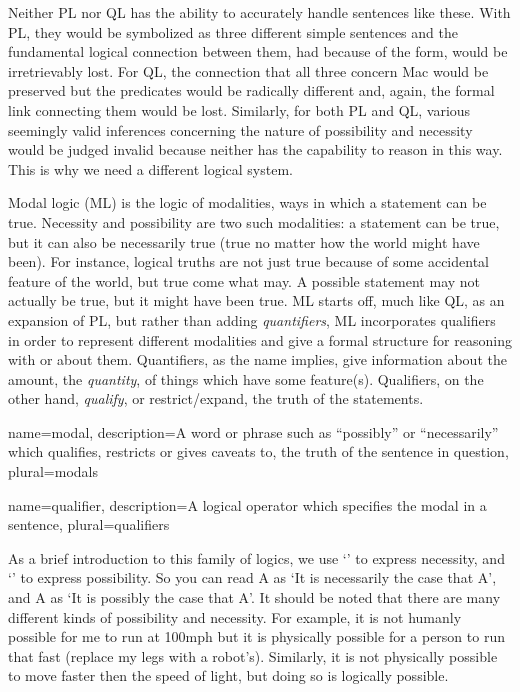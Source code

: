 Neither PL nor QL has the ability to accurately handle sentences like these. With PL, they would be symbolized as three different simple sentences and the fundamental logical connection between them, had because of the form, would be irretrievably lost. For QL, the connection that all three concern Mac would be preserved but the predicates would be radically different and, again, the formal link connecting them would be lost. Similarly, for both PL and QL, various seemingly valid inferences concerning the nature of possibility and necessity would be judged invalid because neither has the capability to reason in this way. This is why we need a different logical system.

Modal logic (ML) is the logic of modalities, ways in which a statement can be true. Necessity and possibility are two such modalities: a statement can be true, but it can also be necessarily true (true no matter how the world might have been). For instance, logical truths are not just true because of some accidental feature of the world, but true come what may. A possible statement may not actually be true, but it might have been true. ML starts off, much like QL, as an expansion of PL, but rather than adding \emph{quantifiers}, ML incorporates \glspl{qualifier} in order to represent different modalities and give a formal structure for reasoning with or about them. Quantifiers, as the name implies, give information about the amount, the \emph{quantity}, of things which have some feature(s). Qualifiers, on the other hand, \emph{qualify}, or restrict/expand, the truth of the statements. 

{
name=modal,
description={A word or phrase such as ``possibly'' or ``necessarily'' which qualifies, restricts or gives caveats to, the truth of the sentence in question},
plural=modals
}

{
name=qualifier,
description={A logical operator which specifies the \gls{modal} in a sentence},
plural=qualifiers
}

As a brief introduction to this family of logics, we use `\ebox' to express necessity, and `\ediamond' to express possibility. So you can read \ebox A as `It is necessarily the case that A', and \ediamond A as `It is possibly the case that A'. It should be noted that there are many different kinds of possibility and necessity. For example, it is not humanly possible for me to run at 100mph but it is physically possible for a person to run that fast (replace my legs with a robot's). Similarly, it is not physically possible to move faster then the speed of light, but doing so is logically possible. 

